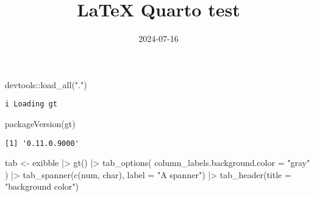 \documentclass[
  letterpaper,
  DIV=11,
  numbers=noendperiod]{scrartcl}
\title{LaTeX Quarto test}
\author{}
\date{2024-07-16}
\newenvironment{Shaded}{\begin{snugshade}}{\end{snugshade}}
\newcommand{\AttributeTok}[1]{\textcolor[rgb]{0.40,0.45,0.13}{#1}}
\newcommand{\FunctionTok}[1]{\textcolor[rgb]{0.28,0.35,0.67}{#1}}
\newcommand{\NormalTok}[1]{\textcolor[rgb]{0.00,0.23,0.31}{#1}}
\newcommand{\OtherTok}[1]{\textcolor[rgb]{0.00,0.23,0.31}{#1}}
\newcommand{\SpecialCharTok}[1]{\textcolor[rgb]{0.37,0.37,0.37}{#1}}
\newcommand{\StringTok}[1]{\textcolor[rgb]{0.13,0.47,0.30}{#1}}
\begin{document}
\maketitle

\listoftables

\begin{Shaded}
\begin{Highlighting}[]
\NormalTok{devtools}\SpecialCharTok{::}\FunctionTok{load\_all}\NormalTok{(}\StringTok{"."}\NormalTok{)}
\end{Highlighting}
\end{Shaded}

\begin{verbatim}
i Loading gt
\end{verbatim}

\begin{Shaded}
\begin{Highlighting}[]
\FunctionTok{packageVersion}\NormalTok{(}\StringTok{\textquotesingle{}gt\textquotesingle{}}\NormalTok{)}
\end{Highlighting}
\end{Shaded}

\begin{verbatim}
[1] '0.11.0.9000'
\end{verbatim}

\newpage{}

\begin{Shaded}
\begin{Highlighting}[]
\NormalTok{tab }\OtherTok{\textless{}{-}}\NormalTok{ exibble }\SpecialCharTok{|\textgreater{}}
  \FunctionTok{gt}\NormalTok{() }\SpecialCharTok{|\textgreater{}}
  \FunctionTok{tab\_options}\NormalTok{(}
    \AttributeTok{column\_labels.background.color =} \StringTok{"gray"}
\NormalTok{  ) }\SpecialCharTok{|\textgreater{}}
  \FunctionTok{tab\_spanner}\NormalTok{(}\FunctionTok{c}\NormalTok{(num, char), }\AttributeTok{label =} \StringTok{"A spanner"}\NormalTok{) }\SpecialCharTok{|\textgreater{}}
  \FunctionTok{tab\_header}\NormalTok{(}\AttributeTok{title =} \StringTok{"background color"}\NormalTok{)}
\end{Highlighting}
\end{Shaded}
\end{document}
